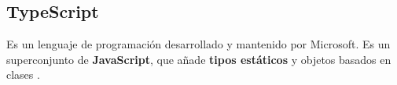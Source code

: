 \documentclass[12pt,twoside,titlepage]{report}
\begin{document}
\subsection{TypeScript}
\label{sec:TypeScript}

Es un lenguaje de programación desarrollado y mantenido por Microsoft. Es un superconjunto de \textbf{JavaScript}, que añade \textbf{tipos estáticos} y objetos basados en clases \cite{typescript}.

\end{document}
